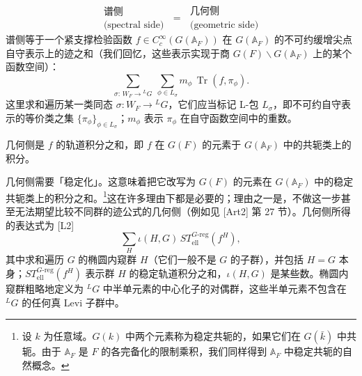 \documentclass[11pt,a4paper]{article}
\begin{document}
\begin{equation}\tag{1.2}
\boxed{\begin{smallmatrix}\text{谱侧}\\ \text{(spectral side)}\end{smallmatrix}}
\;=\;
\boxed{\begin{smallmatrix}\text{几何侧}\\ \text{(geometric side)}\end{smallmatrix}}
\end{equation}
谱侧等于一个紧支撑检验函数 $f\in C_c^\infty(G(\mathbb{A}_F))$ 在 $G(\mathbb{A}_F)$ 的不可约缓增尖点自守表示上的迹之和（我们回忆，这些表示实现于商 $G(F)\backslash G(\mathbb{A}_F)$ 上的某个函数空间）：
\begin{equation}\tag{1.3}
\sum_{\sigma:\,W_F\to{}^{L}G}\ \sum_{\phi\in L_\sigma} m_\phi\,\operatorname{Tr}(f,\pi_\phi).
\end{equation}
这里求和遍历某一类同态 $\sigma:W_F\to{}^{L}G$，它们应当标记 L-包 $L_\sigma$，即不可约自守表示的等价类之集 $\{\pi_\phi\}_{\phi\in L_\sigma}$；$m_\phi$ 表示 $\pi_\phi$ 在自守函数空间中的重数。

几何侧是 $f$ 的轨道积分之和，即 $f$ 在 $G(F)$ 的元素于 $G(\mathbb{A}_F)$ 中的共轭类上的积分。

几何侧需要「稳定化」。这意味着把它改写为 $G(F)$ 的元素在 $G(\mathbb{A}_F)$ 中的稳定共轭类上的积分之和。\footnote{设 $k$ 为任意域。$G(k)$ 中两个元素称为稳定共轭的，如果它们在 $G(\bar k)$ 中共轭。由于 $\mathbb{A}_F$ 是 $F$ 的各完备化的限制乘积，我们同样得到 $\mathbb{A}_F$ 中稳定共轭的自然概念。}这在许多理由下都是必要的；理由之一是，不做这一步甚至无法期望比较不同群的迹公式的几何侧（例如见 [Art2] 第 27 节）。几何侧所得的表达式为 [L2]
\begin{equation}\tag{1.4}
\sum_{H}\iota(H,G)\,ST^{G\text{-}\mathrm{reg}}_{\mathrm{ell}}(f^H),
\end{equation}
其中求和遍历 $G$ 的椭圆内窥群 $H$（它们一般不是 $G$ 的子群），并包括 $H=G$ 本身；$ST^{G\text{-}\mathrm{reg}}_{\mathrm{ell}}(f^H)$ 表示群 $H$ 的稳定轨道积分之和，$\iota(H,G)$ 是某些数。椭圆内窥群粗略地定义为 ${}^{L}G$ 中半单元素的中心化子的对偶群，这些半单元素不包含在 ${}^{L}G$ 的任何真 Levi 子群中。

\end{document}
